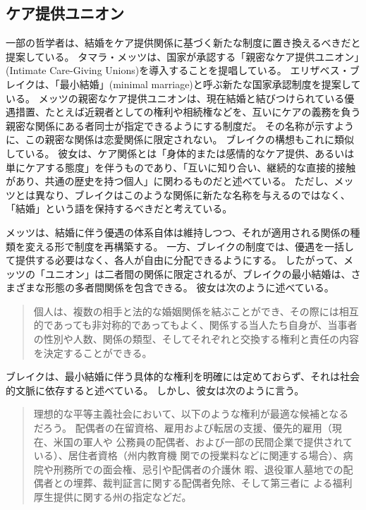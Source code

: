\documentclass[paper=a4,book,openany]{jlreq} \usepackage{mystyle}
\begin{document}
\subsection{ケア提供ユニオン}

一部の哲学者は、結婚をケア提供関係に基づく新たな制度に置き換えるべきだと提案している。
タマラ・メッツは、国家が承認する「親密なケア提供ユニオン」(Intimate Care-Giving Unions)を導入することを提唱している。
エリザベス・ブレイクは、「最小結婚」(minimal marriage)と呼ぶ新たな国家承認制度を提案している\citep{metz10:_untyin_knot,brake12:_minim_marriag}。
メッツの親密なケア提供ユニオンは、現在結婚と結びつけられている優遇措置、たとえば近親者としての権利や相続権などを、互いにケアの義務を負う親密な関係にある者同士が指定できるようにする制度だ。
その名称が示すように、この親密な関係は恋愛関係に限定されない。
ブレイクの構想もこれに類似している。
彼女は、ケア関係とは「身体的または感情的なケア提供、あるいは単にケアする態度」を伴うものであり、「互いに知り合い、継続的な直接的接触があり、共通の歴史を持つ個人」に関わるものだと述べている\citep[p.106]{brake12:_minim_marriag}。
ただし、メッツとは異なり、ブレイクはこのような関係に新たな名称を与えるのではなく、「結婚」という語を保持するべきだと考えている。

メッツは、結婚に伴う優遇の体系自体は維持しつつ、それが適用される関係の種類を変える形で制度を再構築する。
一方、ブレイクの制度では、優遇を一括して提供する必要はなく、各人が自由に分配できるようにする。
したがって、メッツの「ユニオン」は二者間の関係に限定されるが、ブレイクの最小結婚は、さまざまな形態の多者間関係を包含できる。
彼女は次のように述べている。

\begin{quote}
個人は、複数の相手と法的な婚姻関係を結ぶことができ、その際には相互的であっても非対称的であってもよく、関係する当人たち自身が、当事者の性別や人数、関係の類型、そしてそれぞれと交換する権利と責任の内容を決定することができる。
\citep[p.157]{brake12:_minim_marriag}
\end{quote}

ブレイクは、最小結婚に伴う具体的な権利を明確には定めておらず、それは社会的文脈に依存すると述べている。
しかし、彼女は次のように言う。

\begin{quote}
理想的な平等主義社会において、以下のような権利が最適な候補となる
だろう。
配偶者の在留資格、雇用および転居の支援、優先的雇用（現在、米国の軍人や
公務員の配偶者、および一部の民間企業で提供されている）、居住者資格（州内教育機
関での授業料などに関連する場合）、病院や刑務所での面会権、忌引や配偶者の介護休
暇、退役軍人墓地での配偶者との埋葬、裁判証言に関する配偶者免除、そして第三者に
よる福利厚生提供に関する州の指定などだ。
\citep[p.157]{brake12:_minim_marriag}
\end{quote}
\end{document}
